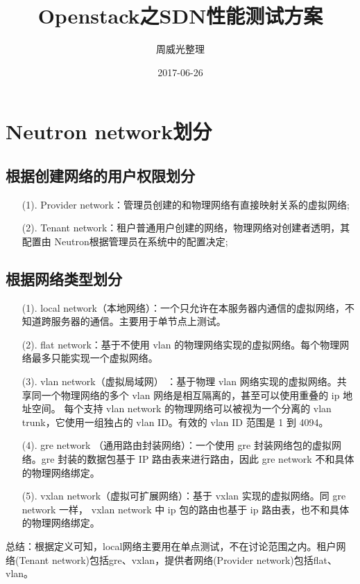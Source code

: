 \documentclass[a4paper,left=1.5cm,right=1.5cm,11pt]{article}
\title{Openstack之SDN性能测试方案}
\author{周威光整理}
\date{2017-06-26}
\begin{document}
\maketitle
\clearpage
\tableofcontents
\clearpage
\section{Neutron network划分}
\subsection{根据创建网络的用户权限划分}
\begin{itemize}
	\item[(1).]Provider network：管理员创建的和物理网络有直接映射关系的虚拟网络;
	\item[(2).]Tenant network：租户普通用户创建的网络，物理网络对创建者透明，其配置由 Neutron根据管理员在系统中的配置决定;
\end{itemize}
\subsection{根据网络类型划分}
\begin{itemize}
	\item[(1).]local network（本地网络）：一个只允许在本服务器内通信的虚拟网络，不知道跨服务器的通信。主要用于单节点上测试。
	\item[(2).]flat network：基于不使用 vlan 的物理网络实现的虚拟网络。每个物理网络最多只能实现一个虚拟网络。
	\item[(3).]vlan network（虚拟局域网） ：基于物理 vlan 网络实现的虚拟网络。共享同一个物理网络的多个 vlan 网络是相互隔离的，甚至可以使用重叠的 ip 地址空间。
		每个支持 vlan network 的物理网络可以被视为一个分离的 vlan trunk，它使用一组独占的 vlan ID。有效的 vlan ID 范围是 1 到 4094。
	\item[(4).]gre network （通用路由封装网络）：一个使用 gre 封装网络包的虚拟网络。gre 封装的数据包基于 IP 路由表来进行路由，因此 gre network 不和具体的物理网络绑定。
	\item[(5).]vxlan network（虚拟可扩展网络）：基于 vxlan 实现的虚拟网络。同 gre network 一样， vxlan network 中 ip 包的路由也基于 ip 路由表，也不和具体的物理网络绑定。
\end{itemize}
总结：根据定义可知，local网络主要用在单点测试，不在讨论范围之内。租户网络(Tenant network)包括gre、vxlan，提供者网络(Provider network)包括flat、vlan。
\end{document}
